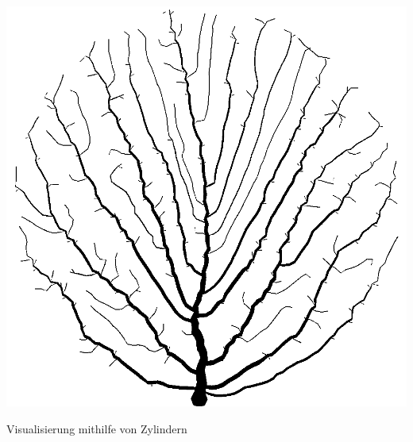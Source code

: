 \newpage
{}
\begin{center}
	\includegraphics[height=.9\textheight]{images/CH3_SCA_Extended4.png}
	
	Visualisierung mithilfe von Zylindern
\end{center}

